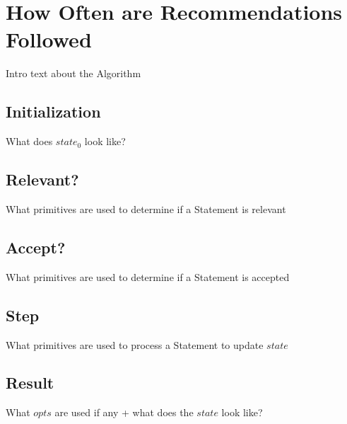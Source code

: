 \documentclass[../main.tex]{subfiles}
\begin{document}
\section{How Often are Recommendations Followed}
Intro text about the Algorithm
\subsection{Initialization}
What does $state_{0}$ look like?
\subsection{Relevant?}
What primitives are used to determine if a Statement is relevant
\subsection{Accept?}
What primitives are used to determine if a Statement is accepted
\subsection{Step}
What primitives are used to process a Statement to update $state$
\subsection{Result}
What $opts$ are used if any + what does the $state$ look like?
\end{document}
